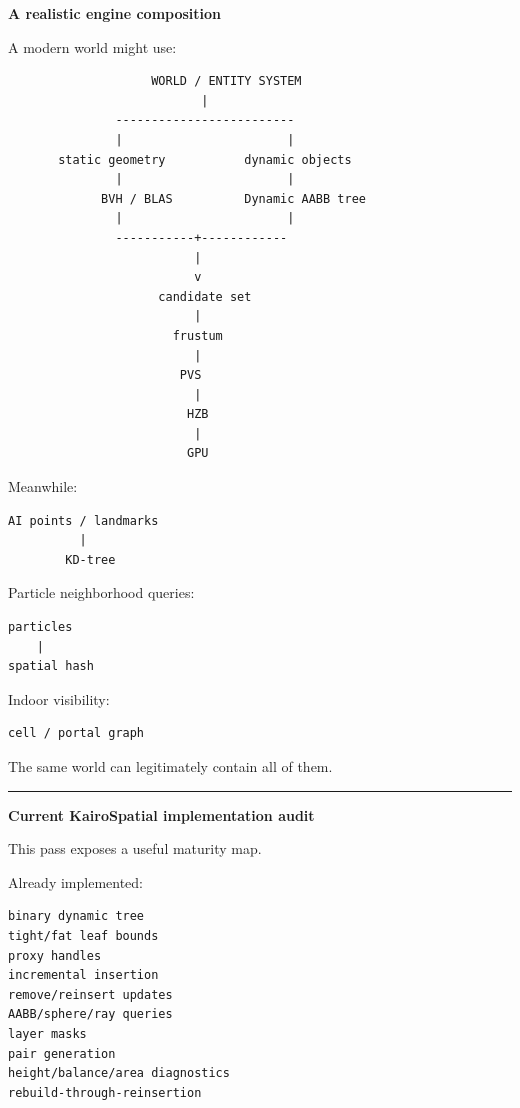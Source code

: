\textbf{A realistic engine composition}

A modern world might use:

\begin{verbatim}
                    WORLD / ENTITY SYSTEM
                           |
               -------------------------
               |                       |
       static geometry           dynamic objects
               |                       |
             BVH / BLAS          Dynamic AABB tree
               |                       |
               -----------+------------
                          |
                          v
                     candidate set
                          |
                       frustum
                          |
                        PVS
                          |
                         HZB
                          |
                         GPU
\end{verbatim}

Meanwhile:

\begin{verbatim}
AI points / landmarks
          |
        KD-tree
\end{verbatim}

Particle neighborhood queries:

\begin{verbatim}
particles
    |
spatial hash
\end{verbatim}

Indoor visibility:

\begin{verbatim}
cell / portal graph
\end{verbatim}

The same world can legitimately contain all of them.

\begin{center}\rule{0.5\linewidth}{0.5pt}\end{center}

\textbf{Current KairoSpatial implementation audit}

This pass exposes a useful maturity map.

\textbf{}

Already implemented:

\begin{verbatim}
binary dynamic tree
tight/fat leaf bounds
proxy handles
incremental insertion
remove/reinsert updates
AABB/sphere/ray queries
layer masks
pair generation
height/balance/area diagnostics
rebuild-through-reinsertion
\end{verbatim}

